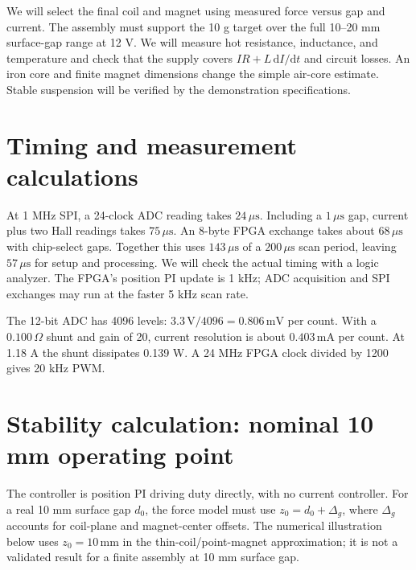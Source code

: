 \documentclass[11pt,letterpaper]{article}
\begin{document}
We will select the final coil and magnet using measured force versus gap
and current. The assembly must support the 10 g target over the full
10--20 mm surface-gap range at 12 V. We will measure hot resistance,
inductance, and temperature and check that the supply covers
\(IR+L\,\mathrm dI/\mathrm dt\) and circuit losses. An iron core and finite
magnet dimensions change the simple air-core estimate. Stable suspension
will be verified by the demonstration specifications.

\section{Timing and measurement calculations}
At 1 MHz SPI, a 24-clock ADC reading takes \(24\,\mu\mathrm s\).
Including a \(1\,\mu\mathrm s\) gap, current plus two Hall readings takes
\(75\,\mu\mathrm s\). An 8-byte FPGA exchange takes about
\(68\,\mu\mathrm s\) with chip-select gaps. Together this uses
\(143\,\mu\mathrm s\) of a \(200\,\mu\mathrm s\) scan period, leaving
\(57\,\mu\mathrm s\) for setup and processing. We will check the actual
timing with a logic analyzer. The FPGA's position PI update is 1 kHz;
ADC acquisition and SPI exchanges may run at the faster 5 kHz scan rate.

The 12-bit ADC has 4096 levels:
\(3.3\,\mathrm V/4096=0.806\,\mathrm{mV}\) per count. With a
\(0.100\,\Omega\) shunt and gain of 20, current resolution is about
\(0.403\,\mathrm{mA}\) per count. At 1.18 A the shunt dissipates 0.139 W.
A 24 MHz FPGA clock divided by 1200 gives 20 kHz PWM.

\section{Stability calculation: nominal 10 mm operating point}
The controller is position PI driving duty directly, with no current
controller. For a real 10 mm surface gap \(d_0\), the force model must use
\(z_0=d_0+\Delta_g\), where \(\Delta_g\) accounts for coil-plane and
magnet-center offsets. The numerical illustration below uses
\(z_0=10\,\mathrm{mm}\) in the thin-coil/point-magnet approximation;
it is not a validated result for a finite assembly at 10 mm surface gap.
\end{document}
